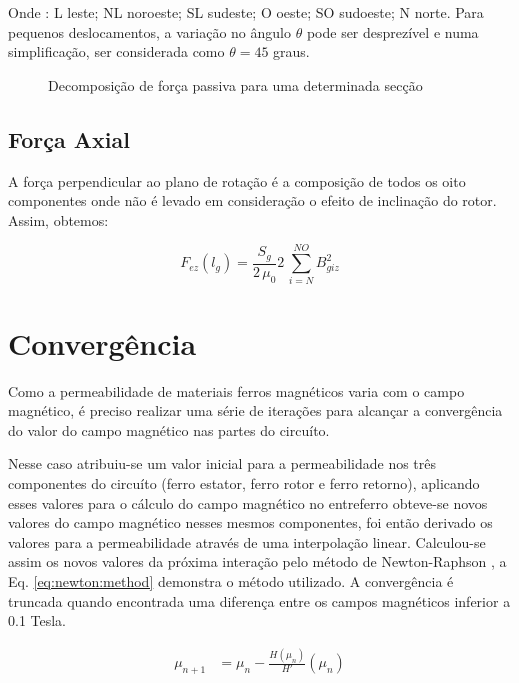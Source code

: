 Onde : L leste; NL noroeste; SL sudeste; O oeste; SO sudoeste; N norte. Para pequenos deslocamentos, a variação no ângulo $\theta$ pode ser desprezível e numa simplificação, ser considerada como $\theta = 45$ graus.

\begin{figure}[!ht]
	\centering
	
	\caption{Decomposição de força passiva para uma determinada secção}
	\label{fig:Passivo:decomposicao}
\end{figure}

\subsection{Força Axial}

A força perpendicular ao plano de rotação é a composição de todos os oito componentes onde não é levado em consideração o efeito de inclinação do rotor. Assim, obtemos:

\begin{equation}
F_{ez}(l_g) = \frac{S_{g}}{2 \, \mu_0} 	2 \,\sum_{i=N}^{NO} B_{giz}^2
\end{equation}

\section{Convergência}

Como a permeabilidade de materiais ferros magnéticos varia com o campo magnético, é preciso realizar uma série de iterações para alcançar a convergência do valor do campo magnético nas partes do circuíto. 

Nesse caso atribuiu-se um valor inicial para a permeabilidade nos três componentes do circuíto (ferro estator, ferro rotor e ferro retorno), aplicando esses valores para o cálculo do campo magnético no entreferro obteve-se novos valores do campo magnético nesses mesmos componentes, foi então derivado os valores para a permeabilidade através de uma interpolação linear. Calculou-se assim os novos valores da próxima interação pelo método de  Newton-Raphson \citep{Ortner2010}, a Eq. \ref{eq:newton:method} demonstra o método utilizado. A convergência é truncada quando encontrada uma diferença entre os campos magnéticos inferior a 0.1 Tesla. 

\begin{align}
	\mu_{n+1} &= \mu_n - \frac{H(\mu_n)}{H'}(\mu_n)
	\label{eq:newton:method}
\end{align} 



